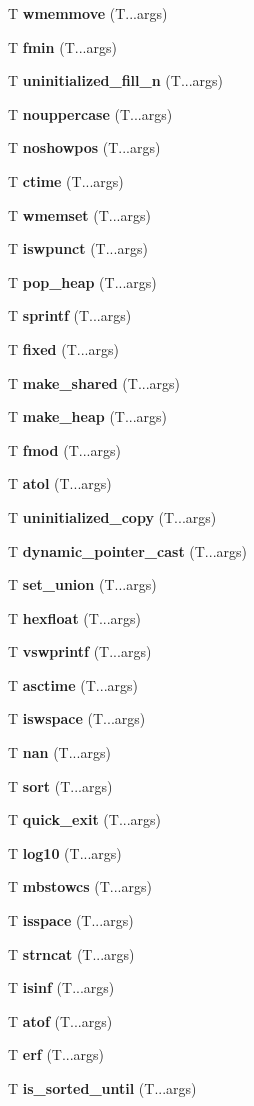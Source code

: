 \begin{DoxyCompactItemize}
T {\bf wmemmove} (T...\+args)
\item 
T {\bf fmin} (T...\+args)
\item 
T {\bf uninitialized\+\_\+fill\+\_\+n} (T...\+args)
\item 
T {\bf nouppercase} (T...\+args)
\item 
T {\bf noshowpos} (T...\+args)
\item 
T {\bf ctime} (T...\+args)
\item 
T {\bf wmemset} (T...\+args)
\item 
T {\bf iswpunct} (T...\+args)
\item 
T {\bf pop\+\_\+heap} (T...\+args)
\item 
T {\bf sprintf} (T...\+args)
\item 
T {\bf fixed} (T...\+args)
\item 
T {\bf make\+\_\+shared} (T...\+args)
\item 
T {\bf make\+\_\+heap} (T...\+args)
\item 
T {\bf fmod} (T...\+args)
\item 
T {\bf atol} (T...\+args)
\item 
T {\bf uninitialized\+\_\+copy} (T...\+args)
\item 
T {\bf dynamic\+\_\+pointer\+\_\+cast} (T...\+args)
\item 
T {\bf set\+\_\+union} (T...\+args)
\item 
T {\bf hexfloat} (T...\+args)
\item 
T {\bf vswprintf} (T...\+args)
\item 
T {\bf asctime} (T...\+args)
\item 
T {\bf iswspace} (T...\+args)
\item 
T {\bf nan} (T...\+args)
\item 
T {\bf sort} (T...\+args)
\item 
T {\bf quick\+\_\+exit} (T...\+args)
\item 
T {\bf log10} (T...\+args)
\item 
T {\bf mbstowcs} (T...\+args)
\item 
T {\bf isspace} (T...\+args)
\item 
T {\bf strncat} (T...\+args)
\item 
T {\bf isinf} (T...\+args)
\item 
T {\bf atof} (T...\+args)
\item 
T {\bf erf} (T...\+args)
\item 
T {\bf is\+\_\+sorted\+\_\+until} (T...\+args)
\item 

\end{DoxyCompactItemize}
